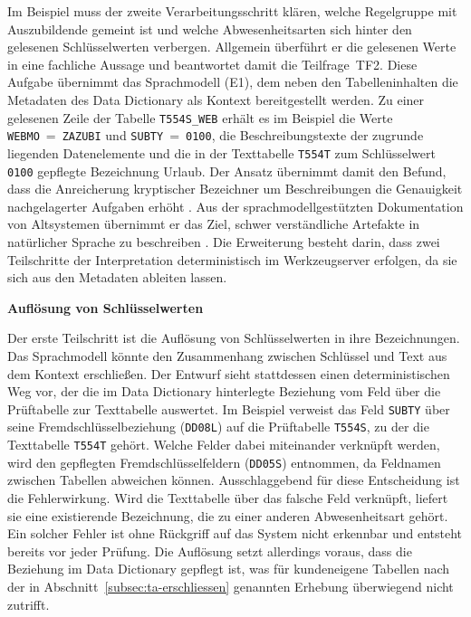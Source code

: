 Im Beispiel muss der zweite Verarbeitungsschritt klären, welche Regelgruppe mit \glqq Auszubildende\grqq{} gemeint ist und welche Abwesenheitsarten sich hinter den gelesenen Schlüsselwerten verbergen. Allgemein überführt er die gelesenen Werte in eine fachliche Aussage und beantwortet damit die Teilfrage~TF2. Diese Aufgabe übernimmt das Sprachmodell (E1), dem neben den Tabelleninhalten die Metadaten des Data Dictionary als Kontext bereitgestellt werden. Zu einer gelesenen Zeile der Tabelle \texttt{T554S\_WEB} erhält es im Beispiel die Werte \texttt{WEBMO}~=~\texttt{ZAZUBI} und \texttt{SUBTY}~=~\texttt{0100}, die Beschreibungstexte der zugrunde liegenden Datenelemente und die in der Texttabelle \texttt{T554T} zum Schlüsselwert \texttt{0100} gepflegte Bezeichnung \glqq Urlaub\grqq. Der Ansatz übernimmt damit den Befund, dass die Anreicherung kryptischer Bezeichner um Beschreibungen die Genauigkeit nachgelagerter Aufgaben erhöht \cite{cai_columbo_2025, wretblad_synthetic_2024}. Aus der sprachmodellgestützten Dokumentation von Altsystemen übernimmt er das Ziel, schwer verständliche Artefakte in natürlicher Sprache zu beschreiben \cite{diggs_leveraging_2024}. Die Erweiterung besteht darin, dass zwei Teilschritte der Interpretation deterministisch im Werkzeugserver erfolgen, da sie sich aus den Metadaten ableiten lassen.

\textbf{Auflösung von Schlüsselwerten}

Der erste Teilschritt ist die Auflösung von Schlüsselwerten in ihre Bezeichnungen. Das Sprachmodell könnte den Zusammenhang zwischen Schlüssel und Text aus dem Kontext erschließen. Der Entwurf sieht stattdessen einen deterministischen Weg vor, der die im Data Dictionary hinterlegte Beziehung vom Feld über die Prüftabelle zur Texttabelle auswertet. Im Beispiel verweist das Feld \texttt{SUBTY} über seine Fremdschlüsselbeziehung (\texttt{DD08L}) auf die Prüftabelle \texttt{T554S}, zu der die Texttabelle \texttt{T554T} gehört. Welche Felder dabei miteinander verknüpft werden, wird den gepflegten Fremdschlüsselfeldern (\texttt{DD05S}) entnommen, da Feldnamen zwischen Tabellen abweichen können. Ausschlaggebend für diese Entscheidung ist die Fehlerwirkung. Wird die Texttabelle über das falsche Feld verknüpft, liefert sie eine existierende Bezeichnung, die zu einer anderen Abwesenheitsart gehört. Ein solcher Fehler ist ohne Rückgriff auf das System nicht erkennbar und entsteht bereits vor jeder Prüfung. Die Auflösung setzt allerdings voraus, dass die Beziehung im Data Dictionary gepflegt ist, was für kundeneigene Tabellen nach der in Abschnitt~\ref{subsec:ta-erschliessen} genannten Erhebung überwiegend nicht zutrifft.

